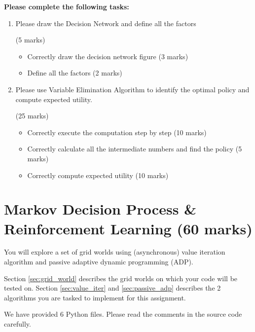 \documentclass[12pt]{article}
\begin{document}
\textbf{Please complete the following tasks:}
\begin{enumerate}
    \item Please draw the Decision Network and define all the factors
    \begin{markscheme}
        (5 marks)
        \begin{itemize}
            \item Correctly draw the decision network figure (3 marks)
            \item Define all the factors                     (2 marks)
        \end{itemize}
    \end{markscheme}

    \item Please use Variable Elimination Algorithm to identify the optimal policy and compute expected utility.
    \begin{markscheme}
        (25 marks)
        \begin{itemize}
            \item Correctly execute the computation step by step (10 marks)
            \item Correctly calculate all the intermediate numbers and find the policy (5 marks)
            \item Correctly compute expected utility (10 marks)
        \end{itemize}
    \end{markscheme}
\end{enumerate}


\newpage
\section{Markov Decision Process \& Reinforcement Learning (60 marks)}
\label{question_dt}

You will explore a set of grid worlds using (asynchronous) value iteration algorithm and passive adaptive dynamic programming (ADP).

Section \ref{sec:grid_world} describes the grid worlds on which your code will be tested on. Section \ref{sec:value_iter} and \ref{sec:passive_adp} describes the 2 algorithms you are tasked to implement for this assignment.

We have provided 6 Python files. Please read the comments in the source code carefully.
\end{document}
